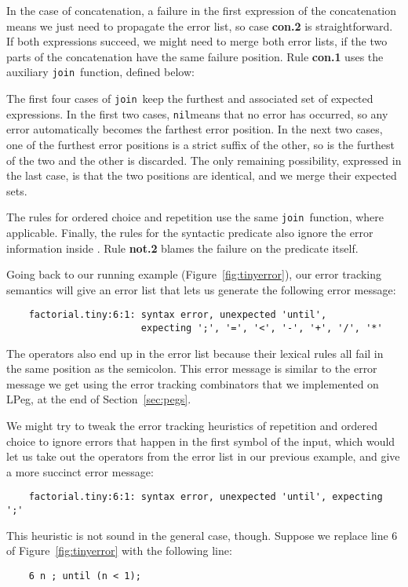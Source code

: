 \documentclass[3p,12pt,singlecolumn]{elsarticle}
\newcommand{\Nil}{{\tt nil}}
\newcommand{\J}{{\tt join}}
\begin{document}
In the case of concatenation, a failure in the first
expression of the concatenation means we just need to
propagate the error list, so case {\bf con.2} is
straightforward. If both expressions succeed, we might
need to merge both error lists, if the two parts
of the concatenation have the same failure position.
Rule {\bf con.1} uses the auxiliary \J\ function, 
defined below:


The first four cases of \J\ keep the furthest
and associated set of expected expressions. In the first
two cases, \Nil means that no error has occurred,
so any error automatically becomes the farthest
error position. In the next two cases, one of the
furthest error positions is a strict suffix of the
other, so is the furthest of the two and the other
is discarded. The only remaining possibility,
expressed in the last case, is that
the two positions are identical, and we merge their
expected sets.

The rules for ordered choice and repetition use the
same \J\ function, where applicable. Finally, the rules
for the syntactic predicate  also ignore the error
information inside . Rule {\bf not.2} blames the
failure on the predicate itself.

Going back to our running example (Figure~\ref{fig:tinyerror}),
our error tracking semantics will give an error list that
lets us generate the following error message:
\begin{verbatim}
    factorial.tiny:6:1: syntax error, unexpected 'until',
                        expecting ';', '=', '<', '-', '+', '/', '*'
\end{verbatim}

The operators also end up in the error list because
their lexical rules all fail in the same position as
the semicolon. This error message is similar to the
error message we get using the error tracking
combinators that we implemented on LPeg, at the end of
Section~\ref{sec:pegs}.

We might try to tweak the error tracking heuristics of
repetition and ordered choice to ignore errors that happen
in the first symbol of the input, which would let us
take out the operators from the error list in our previous
example, and give a more succinct error message:
\begin{verbatim}
    factorial.tiny:6:1: syntax error, unexpected 'until', expecting ';'
\end{verbatim}

This heuristic is not sound in the general case, though.
Suppose we replace line 6 of Figure~\ref{fig:tinyerror}
with the following line:
\begin{verbatim}
    6 n ; until (n < 1);
\end{verbatim}
\end{document}

